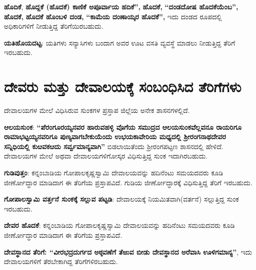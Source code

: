 \textbf{ಹೊದಿಕೆ},\textbf{ ಹೊದ್ದಕೆ (ಹೊದಕೆ) ಕಾಣಿಕೆ ಅಪೂರ್ವಾಯ ಹದಿಕೆ”,}\textbf{ ಹೊದಕೆ,}\textbf{ “ದಂಡದೋಷ\general{\break } ಹೊದಕೆಯೆಂಬ”,}\textbf{ ಹೊದಕೆ,}\textbf{ ಹೊದಕೆ ಹೊಂಬಳಿ ದಂಡ,}\textbf{ “ಕಾಮೆಯ ದಂಣಾಯ್ಕರ ಹೊದಕೆ”,} ಇದು ದಂಡದ ರೂಪದಲ್ಲಿ ಅಧಿಕಾರಿಗಳಿಗೆ ನೀಡುತ್ತಿದ್ದ ತೆರಿಗೆಯಿರಬಹುದು.

\textbf{ಯತಿಹೊಯದಟ್ಟ}: ಯತಿಗಳು ಸನ್ಯಾಸಿಗಳು ಬಂದಾಗ ಅವರ ಊಟ ವಸತಿ ವ್ಯವಸ್ಥೆ ಮಾಡಲು ನೀಡುತ್ತಿದ್ದ ತೆರಿಗೆ ಇರಬಹುದು.

\section*{ದೇವರು ಮತ್ತು ದೇವಾಲಯಕ್ಕೆ ಸಂಬಂಧಿಸಿದ ತೆರಿಗೆಗಳು}

ದೇವಾಲಯಗಳ ಮೇಲೆ ವಿಧಿಸಿರುವ ಸುಂಕಗಳ ಪ್ರಸ್ತಾಪ ಜಿಲ್ಲೆಯ ಅನೇಕ ಶಾಸನಗಳಲ್ಲಿದೆ.

\textbf{ಆಲಯಸುಂಕ}: \textbf{“ಪೆರಂಗೂರಯ್ಯನವರ ಹಾರುವಹಳ್ಳಿ ವೊಗೆಯ ಸಮುದ್ರದ ಆಲಯಸುಂಕವೆಲ್ಲವನೂ\general{\break } ರಾಯರಿಗೂ ರಾಮಾಭಟ್ಟಯ್ಯನವರಿಗೂ ಪುಣ್ಯವಾಗಬೇಕುಯೆಂದು ಉಭಯಕಾವೇರಿಯ ಮಧ್ಯದಲ್ಲಿ ಶ‍್ರೀರಂಗನಾಥದೇವರ ಸನ್ನಿಧಿಯಲ್ಲಿ ಕುೞವಕೞದು ಸರ್ವ್ವಮಾನ್ಯವಾಗಿ”} ಬಿಡಲಾಯಿತೆಂದು ಶ‍್ರೀರಂಗಪಟ್ಟಣ ಶಾಸನದಲ್ಲಿ ಹೇಳಿದೆ. ದೇವಾಲಯಗಳ ಮೇಲೆ ಅಥವಾ ದೇವಾಲಯಗಳಿಗೋಸ್ಕರ ವಿಧಿಸುತ್ತಿದ್ದ ಸುಂಕ ಇದಾಗಿರಬಹುದು.

\textbf{ಗುಡಿವುತ್ತಂ}: ಕನ್ನಂಬಾಡಿಯ ಗೋಪಾಲಕೃಷ್ಣಸ್ವಾಮಿ ದೇವಾಲಯವನ್ನು ಹದಿನೆಂಟು ಸಮಯದವರು ಕೂಡಿ ಜೀರ್ಣೋದ್ಧಾರ ಮಾಡಿದಾಗ ಈ ತೆರಿಗೆಯ ಪ್ರಸ್ತಾಪವಿದೆ. ಗುಡಿಯ ಜೀರ್ಣೋದ್ಧಾರಕ್ಕೆ ವಿಧಿಸುತ್ತಿದ್ದ ತೆರಿಗೆ ಇರಬಹುದು.

\textbf{ಗೋಪಾಲಸ್ವಾಮಿ ವರ್ತ್ತನೆ ಸುಂಕಕ್ಕೆ ಸಲ್ಲುವ ಪಟ್ಟಡಿ}: ದೇವಾಲಯಕ್ಕೆ ನಿಯಮಿತವಾಗಿ(ವರ್ತನೆ) ಸಲ್ಲುತ್ತಿದ್ದ ಸುಂಕ ಇರಬಹುದು.

\textbf{ದೇವರ ಹೊದಕೆ}: ಕನ್ನಂಬಾಡಿಯ ಗೋಪಾಲಕೃಷ್ಣಸ್ವಾಮಿ ದೇವಾಲಯವನ್ನು ಹದಿನೆಂಟು ಸಮಯದವರು ಕೂಡಿ ಜೀರ್ಣೋದ್ಧಾರ ಮಾಡಿದಾಗ ಈ ತೆರಿಗೆಯ ಪ್ರಸ್ತಾಪವಿದೆ.

\textbf{ದೇವಸ್ಥಾನದ ತೆರಿಗೆ: “ವೀರಭದ್ರದುರ್ಗದ ಅಠ್ಠವಣೆಗೆ ತೆಱುವ ಬೀಡು ದೇವಸ್ಥಾನದ ಅರೆವಾಸಿ ಊಳಿಗಮಾನ್ಯ”}, ಇದು ದೇವಾಲಯಗಳಿಗೆ ತೆರಬೇಕಾಗಿದ್ದ ತೆರಿಗೆಗಳಿರಬಹುದು.

